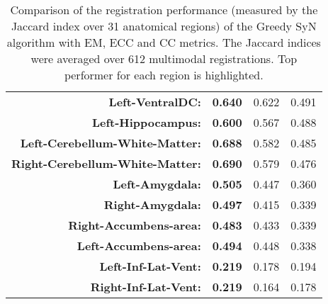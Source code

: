 \begin{table}[htbp]
{\begin{tabular}{rrrr}
    \textbf{Left-VentralDC:} & \textbf{0.640} & 0.622 & 0.491 \\
    \textbf{Left-Hippocampus:} & \textbf{0.600} & 0.567 & 0.488 \\
    \textbf{Left-Cerebellum-White-Matter:} & \textbf{0.688} & 0.582 & 0.485 \\
    \textbf{Right-Cerebellum-White-Matter:} & \textbf{0.690} & 0.579 & 0.476 \\
    \textbf{Left-Amygdala:} & \textbf{0.505} & 0.447 & 0.360 \\
    \textbf{Right-Amygdala:} & \textbf{0.497} & 0.415 & 0.339 \\
    \textbf{Right-Accumbens-area:} & \textbf{0.483} & 0.433 & 0.339 \\
    \textbf{Left-Accumbens-area:} & \textbf{0.494} & 0.448 & 0.338 \\
    \textbf{Left-Inf-Lat-Vent:} & \textbf{0.219} & 0.178 & 0.194 \\
    \textbf{Right-Inf-Lat-Vent:} & \textbf{0.219} & 0.164 & 0.178 \\
    \bottomrule
    \end{tabular}}%
    \caption{Comparison of the registration performance (measured by the Jaccard index over 31 anatomical regions) of the Greedy SyN algorithm with EM, ECC and CC metrics. The Jaccard
indices were averaged over 612 multimodal registrations. Top performer for each region is highlighted.}
  \label{tab:multimodal_results_seg}%
\end{table}%
